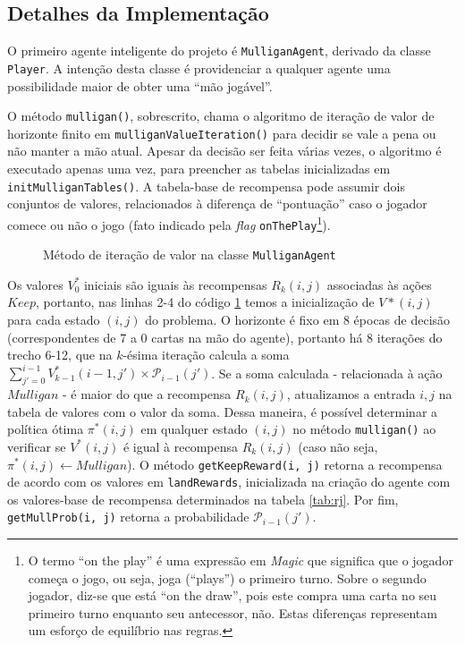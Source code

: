 \documentclass[dvipsnames]{book}
\begin{document}
\subsection{Detalhes da Implementação}

O primeiro agente inteligente do projeto é \texttt{MulliganAgent}, derivado da classe \texttt{Player}. A intenção desta classe é providenciar a qualquer agente uma possibilidade maior de obter uma ``mão jogável''.

\begin{figure}[h!]
  
\end{figure}

O método \texttt{mulligan()}, sobrescrito, chama o algoritmo de iteração de valor de horizonte finito em \texttt{mulliganValueIteration()} para decidir se vale a pena ou não manter a mão atual. Apesar da decisão ser feita várias vezes, o algoritmo é executado apenas uma vez, para preencher as tabelas inicializadas em \texttt{initMulliganTables()}. A tabela-base de recompensa pode assumir dois conjuntos de valores, relacionados à diferença de ``pontuação'' caso o jogador comece ou não o jogo (fato indicado pela \textit{flag} \texttt{onThePlay}\footnote{O termo ``on the play'' é uma expressão em \textit{Magic} que significa que o jogador começa o jogo, ou seja, joga (``plays'') o primeiro turno. Sobre o segundo jogador, diz-se que está ``on the draw'', pois este compra uma carta no seu primeiro turno enquanto seu antecessor, não. Estas diferenças representam um esforço de equilíbrio nas regras.}).
\begin{figure}[h!]
  
  \label{code:valueit}
  \caption{Método de iteração de valor na classe \texttt{MulliganAgent}}
\end{figure}
Os valores $V^*_0$ iniciais são iguais às recompensas $R_k(i,j)$ associadas às ações $Keep$, portanto, nas linhas 2-4 do código \ref{code:valueit} temos a inicialização de $V*(i, j)$ para cada estado $(i, j)$ do problema. O horizonte é fixo em 8 épocas de decisão (correspondentes de 7 a 0 cartas na mão do agente), portanto há 8 iterações do trecho 6-12, que na $k$-ésima iteração calcula a soma $\sum_{j' = 0}^{i-1}V^*_{k-1}(i-1,j')\times\mathcal{P}_{i-1}(j')$. Se a soma calculada - relacionada à ação $Mulligan$ - é maior do que a recompensa $R_k(i, j)$, atualizamos a entrada $i, j$ na tabela de valores com o valor da soma. Dessa maneira, é possível determinar a política ótima $\pi^*(i,j)$  em qualquer estado $(i,j)$ no método \texttt{mulligan()} ao verificar se $V^*(i, j)$ é igual à recompensa $R_k(i,j)$ (caso não seja, $\pi^*(i,j) \gets Mulligan$). O método \texttt{getKeepReward(i, j)} retorna a recompensa de acordo com os valores em \texttt{landRewards}, inicializada na criação do agente com os valores-base de recompensa determinados na tabela \ref{tab:rj}. Por fim, \texttt{getMullProb(i, j)} retorna a probabilidade $\mathcal{P}_{i-1}(j')$.
\newpage
\end{document}

